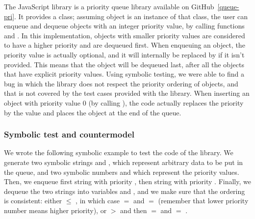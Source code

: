 \FloatBarrier


The JavaScript  library is a priority queue library available on GitHub~\ref{queue-pri}.
It provides a  class; assuming object  is an instance of that class, the user can enqueue and dequeue objects with an integer priority value, by calling functions  and .
In this implementation, objects with smaller priority values are considered to have a higher priority and are dequeued first.
When enqueuing an object, the priority value is actually optional, and it will internally be replaced by  if it isn't provided.
This means that the object will be dequeued last, after all the objects that have explicit priority values.
Using \cosette symbolic testing, we were able to find a bug in which the library does not respect the priority ordering of objects, and that is not covered by the test cases provided with the library.
When inserting an object with priority value $0$ (by calling ), the code actually replaces the priority by the  value and places the object at the end of the queue.

\subsubsection{Symbolic test and countermodel}

We wrote the following symbolic example to test the code of the library.
We generate two symbolic strings  and , which represent arbitrary data to be put in the queue, and two symbolic numbers  and  which represent the priority values.
Then, we enqueue first string  with priority , then string  with priority .
Finally, we dequeue the two strings into variables  and , and we make sure that the ordering is consistent: either  $\leq$ , in which case  $=$  and  $=$  (remember that lower priority number means higher priority), or  $>$  and then  $=$  and  $=$ .

